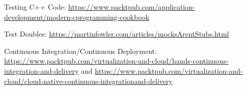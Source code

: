Testing C++ Code: \url{https://www.packtpub.com/application-development/modern-cprogramming-cookbook}

Test Doubles: \url{https://martinfowler.com/articles/mocksArentStubs.html}

Continuous Integration/Continuous Deployment: \url{https://www.packtpub.com/virtualization-and-cloud/hands-continuous-integration-and-delivery} and \url{https://www.packtpub.com/virtualization-and-cloud/cloud-native-continuous-integrationand-delivery}